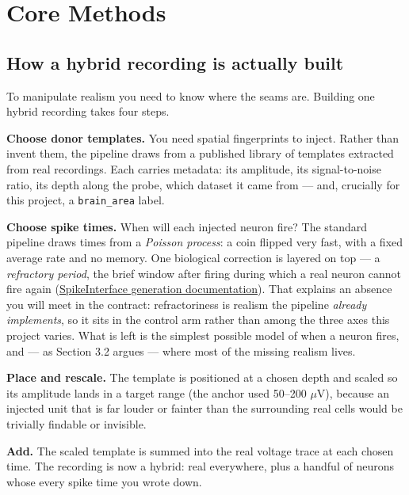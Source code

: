 \documentclass[12pt]{article}
\begin{document}
\section{Core Methods}

\subsection{How a hybrid recording is actually built}

To manipulate realism you need to know where the seams are. Building one hybrid recording
takes four steps.

\textbf{Choose donor templates.} You need spatial fingerprints to inject. Rather than invent
them, the pipeline draws from a published library of templates extracted from real
recordings. Each carries metadata: its amplitude, its signal-to-noise ratio, its depth along
the probe, which dataset it came from --- and, crucially for this project, a
\texttt{brain\_area} label.

\textbf{Choose spike times.} When will each injected neuron fire? The standard pipeline draws
times from a \emph{Poisson process}: a coin flipped very fast, with a fixed average rate and
no memory. One biological correction is layered on top --- a \emph{refractory period}, the brief
window after firing during which a real neuron cannot fire again
(\href{https://spikeinterface.readthedocs.io/en/stable/modules/generation.html}{SpikeInterface
generation documentation}). That explains an absence you will meet in the contract:
refractoriness is realism the pipeline \emph{already implements}, so it sits in the control arm
rather than among the three axes this project varies. What is left is the simplest possible
model of when a neuron fires, and --- as Section 3.2 argues --- where most of the missing
realism lives.

\textbf{Place and rescale.} The template is positioned at a chosen depth and scaled so its
amplitude lands in a target range (the anchor used 50--200 $\mu$V), because an injected unit
that is far louder or fainter than the surrounding real cells would be trivially findable or
invisible.

\textbf{Add.} The scaled template is summed into the real voltage trace at each chosen time.
The recording is now a hybrid: real everywhere, plus a handful of neurons whose every spike
time you wrote down.
\end{document}
